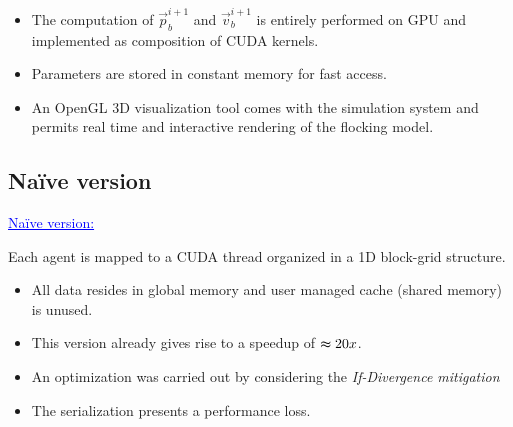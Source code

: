 \documentclass{beamer}
\begin{document}
\begin{frame}
\begin{itemize}
\item The computation of $\vec{p}_b^{i+1}$ 
and $\vec{v}_b^{i+1}$  is entirely performed on GPU
and implemented as composition of CUDA kernels.
\item Parameters are stored in constant memory for fast access.
\item An OpenGL 3D visualization tool comes with the simulation
system and permits real time and interactive rendering of the
flocking model.
\end{itemize}
\end{frame}

\subsection{Na\"{i}ve version}
\begin{frame}
\textcolor{blue}{\underline{Na\"{i}ve version:}}

Each agent is mapped to a CUDA thread organized in a 1D block-grid structure. 
\begin{itemize}
\item All data resides in global memory and user managed cache (shared memory) is
unused.
\item This version already gives rise to a
speedup of $ \thickapprox 20x$.
\item An optimization was carried out by considering the \textit{If-Divergence mitigation}
\item The serialization presents a performance loss. 
\end{itemize}
\end{frame}
\end{document}
